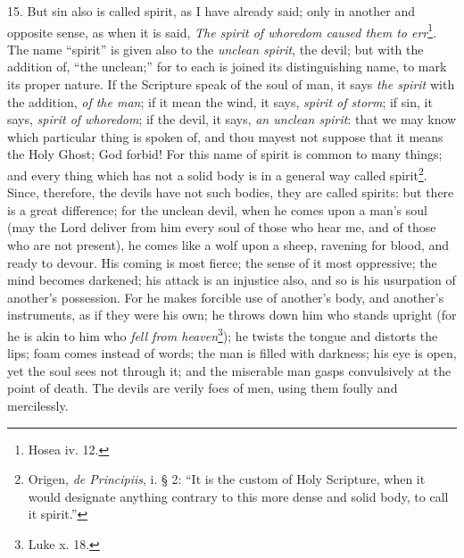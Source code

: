 15. But sin also is called spirit, as I have already said; only in another and opposite sense, as when it is said, \emph{The spirit of whoredom caused them to err}\footnote{Hosea iv. 12.}. The name “spirit” is given also to the \emph{unclean spirit}, the devil; but with the addition of, “the unclean;” for to each is joined its distinguishing name, to mark its proper nature. If the Scripture speak of the soul of man, it says \emph{the spirit} with the addition, \emph{of the man}; if it mean the wind, it says, \emph{spirit of storm}; if sin, it says, \emph{spirit of whoredom}; if the devil, it says, \emph{an unclean spirit}: that we may know which particular thing is spoken of, and thou mayest not suppose that it means the Holy Ghost; God forbid! For this name of spirit is common to many things; and every thing which has not a solid body is in a general way called spirit\footnote{Origen, \emph{de Principiis}, i. § 2: “It is the custom of Holy Scripture, when it would designate anything contrary to this more dense and solid body, to call it spirit.”}. Since, therefore, the devils have not such bodies, they are called spirits: but there is a great difference; for the unclean devil, when he comes upon a man’s soul (may the Lord deliver from him every soul of those who hear me, and of those who are not present), he comes like a wolf upon a sheep, ravening for blood, and ready to devour. His coming is most fierce; the sense of it most oppressive; the mind becomes darkened; his attack is an injustice also, and so is his usurpation of another’s possession. For he makes forcible use of another’s body, and another’s instruments, as if they were his own; he throws down him who stands upright (for he is akin to him who \emph{fell from heaven}\footnote{Luke x. 18.}); he twists the tongue and distorts the lips; foam comes instead of words; the man is filled with darkness; his eye is open, yet the soul sees not through it; and the miserable man gasps convulsively at the point of death. The devils are verily foes of men, using them foully and mercilessly.

